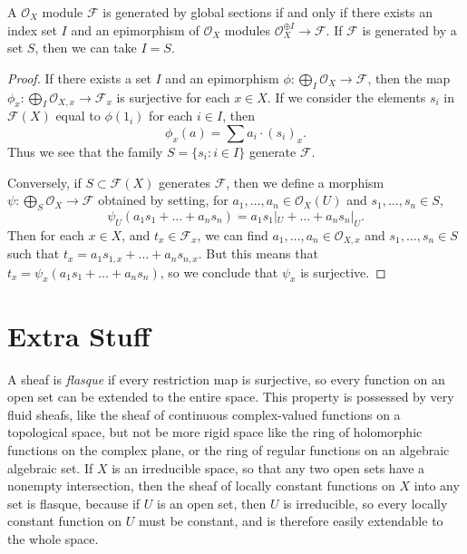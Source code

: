 \begin{lemma}
    A $\mathcal{O}_X$ module $\mathcal{F}$ is generated by global sections if and only if there exists an index set $I$ and an epimorphism of $\mathcal{O}_X$ modules $\mathcal{O}_X^{\oplus I} \to \mathcal{F}$. If $\mathcal{F}$ is generated by a set $S$, then we can take $I = S$.
\end{lemma}
\begin{proof}
    If there exists a set $I$ and an epimorphism $\phi: \bigoplus_I \mathcal{O}_X \to \mathcal{F}$, then the map $\phi_x: \bigoplus_I \mathcal{O}_{X,x} \to \mathcal{F}_x$ is surjective for each $x \in X$. If we consider the elements $s_i$ in $\mathcal{F}(X)$ equal to $\phi(1_i)$ for each $i \in I$, then
    \[ \phi_x \left( a \right) = \sum a_i \cdot (s_i)_x. \]
    Thus we see that the family $S = \{ s_i : i \in I \}$ generate $\mathcal{F}$.

    Conversely, if $S \subset \mathcal{F}(X)$ generates $\mathcal{F}$, then we define a morphism $\psi: \bigoplus_S \mathcal{O}_X \to \mathcal{F}$ obtained by setting, for $a_1,\dots,a_n \in \mathcal{O}_X(U)$ and $s_1,\dots,s_n \in S$,
    \[ \psi_U \left( a_1 s_1 + \dots + a_n s_n \right) = a_1 s_1|_U + \dots + a_n s_n|_U. \]
    Then for each $x \in X$, and $t_x \in \mathcal{F}_x$, we can find $a_1,\dots,a_n \in \mathcal{O}_{X,x}$ and $s_1,\dots,s_n \in S$ such that $t_x = a_1 s_{1,x} + \dots + a_n s_{n,x}$. But this means that $t_x = \psi_x(a_1s_1 + \dots + a_n s_n)$, so we conclude that $\psi_x$ is surjective.
\end{proof}

\section{Extra Stuff}

A sheaf is \emph{flasque} if every restriction map is surjective, so every function on an open set can be extended to the entire space. This property is possessed by very fluid sheafs, like the sheaf of continuous complex-valued functions on a topological space, but not be more rigid space like the ring of holomorphic functions on the complex plane, or the ring of regular functions on an algebraic algebraic set. If $X$ is an irreducible space, so that any two open sets have a nonempty intersection, then the sheaf of locally constant functions on $X$ into any set is flasque, because if $U$ is an open set, then $U$ is irreducible, so every locally constant function on $U$ must be constant, and is therefore easily extendable to the whole space.

